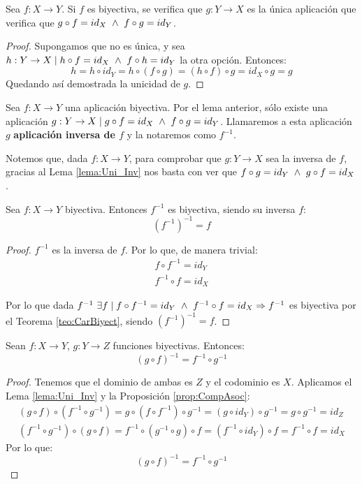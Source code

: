 \begin{lema}[Unicidad]\label{lema:Uni_Inv}
    Sea $f:X\to Y$. Si $f$ es biyectiva, se verifica que $g:Y \rightarrow X$ es la única aplicación que verifica que $g \circ f = id_X \ \land \  f \circ g = id_Y$.
\end{lema}
\begin{proof}
    Supongamos que no es única, y sea $h:Y \rightarrow X \mid h \circ f = id_X \ \land \  f \circ h = id_Y$ la otra opción. Entonces:
    $$h = h \circ id_Y = h \circ (f \circ g) = (h \circ f) \circ g = id_X \circ g = g$$
    Quedando así demostrada la unicidad de $g$.
\end{proof}

\begin{definicion}[Inversa]
    Sea $f:X \rightarrow Y$ una aplicación biyectiva. Por el lema anterior, sólo existe una aplicación $g:Y \rightarrow X \mid g \circ f = id_X \ \land \  f \circ g = id_Y$. Llamaremos a esta aplicación $g$ \textbf{aplicación
        inversa de $f$} y la notaremos como $f^{-1}$.
\end{definicion}


Notemos que, dada $f:X \rightarrow Y$, para comprobar que $g:Y \rightarrow X$ sea la inversa de $f$, gracias al Lema \ref{lema:Uni_Inv} nos basta con ver que $f \circ g = id_Y \ \land \  g \circ f = id_X$.

\begin{lema}
    Sea $f:X \rightarrow Y$ biyectiva. Entonces $f^{-1}$ es biyectiva, siendo su inversa $f$:
    $$(f^{-1})^{-1} = f$$
\end{lema}
\begin{proof}
    $f^{-1}$ es la inversa de $f$. Por lo que, de manera trivial:
    \begin{gather*}
        f \circ f^{-1} = id_Y \\
        f^{-1} \circ f = id_X
    \end{gather*}
    
    Por lo que dada $f^{-1}~\exists f \mid f \circ f^{-1} = id_Y \ \land \  f^{-1} \circ f = id_X \Rightarrow f^{-1}$ es biyectiva por el Teorema \ref{teo:CarBiyect}, siendo $(f^{-1})^{-1} = f$.
\end{proof}

\begin{lema}
    Sean $f:X \rightarrow Y$, $g:Y \rightarrow Z$ funciones biyectivas. Entonces:
    $$(g \circ f)^{-1} = f^{-1} \circ g^{-1}$$
\end{lema}
\begin{proof}
Tenemos que el dominio de ambas es $Z$ y el codominio es $X$. Aplicamos el Lema \ref{lema:Uni_Inv} y la Proposición \ref{prop:CompAsoc}:
\begin{gather*}
    (g \circ f) \circ (f^{-1} \circ g^{-1}) = g \circ (f \circ f^{-1}) \circ g^{-1} = (g \circ id_Y) \circ g^{-1} = g \circ g^{-1} = id_Z \\
    (f^{-1} \circ g^{-1}) \circ (g \circ f) = f^{-1} \circ (g^{-1} \circ g) \circ f = (f^{-1} \circ id_Y) \circ f = f^{-1} \circ f = id_X
\end{gather*}
Por lo que: $$(g \circ f)^{-1} = f^{-1} \circ g^{-1}$$
\end{proof}

